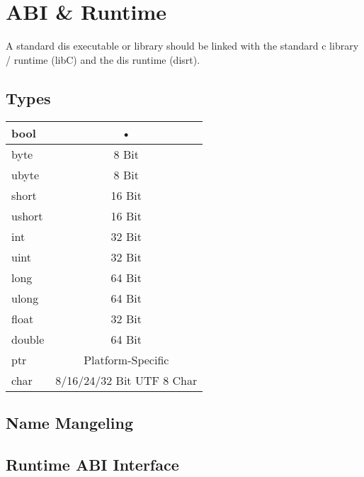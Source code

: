 \section{ABI \& Runtime}

A standard dis executable or library should be linked with the standard c library / runtime (libC) and the dis runtime (disrt).

\subsection{Types}
\begin{tabular}{|l|c|}
\hline 
bool    & • \\ \hline 
byte    & 8 Bit \\ \hline
ubyte   & 8 Bit \\ \hline
short   & 16 Bit \\ \hline
ushort  & 16 Bit \\ \hline
int     & 32 Bit \\ \hline
uint    & 32 Bit \\ \hline
long    & 64 Bit \\ \hline
ulong   & 64 Bit \\ \hline
float   & 32 Bit \\ \hline
double  & 64 Bit \\ \hline
ptr     & Platform-Specific \\ \hline
char    & 8/16/24/32 Bit UTF 8 Char \\ \hline
\end{tabular} 

 

\subsection{Name Mangeling}

\subsection{Runtime ABI Interface}